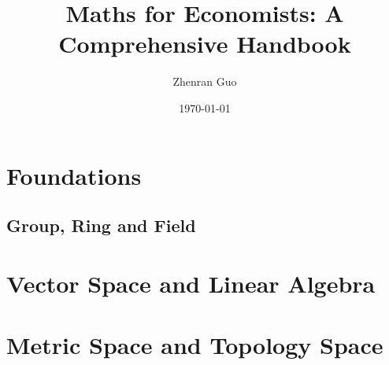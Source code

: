 \documentclass{myBook}
\title{Maths for Economists: A Comprehensive Handbook}
\author{Zhenran Guo}
\date{\today}
\begin{document}
\frontmatter



\maketitle\pagebreak





\tableofcontents

\mainmatter

\part{Foundations}









\chapter{Group, Ring and Field}




\part{Vector Space and Linear Algebra}






\part{Metric Space and Topology Space}


\end{document}
